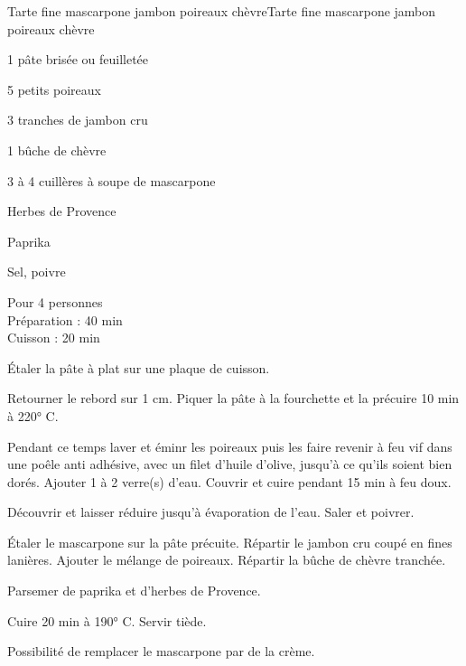 \begin{recette}{Tarte fine mascarpone jambon poireaux chèvre}{Tarte fine mascarpone jambon poireaux chèvre}

\begin{ingredients}
1 pâte brisée ou feuilletée\par
5 petits poireaux\par
3 tranches de jambon cru\par
1 bûche de chèvre\par
3 à 4 cuillères à soupe de mascarpone\par
Herbes de Provence\par
Paprika\par
Sel, poivre\par
\end{ingredients}

\begin{infos}
Pour 4 personnes\\
Préparation : 40 min\\
Cuisson : 20 min\\
\end{infos}

\begin{etapes}
\item Étaler la pâte à plat sur une plaque de cuisson.
\item Retourner le rebord sur 1 cm. Piquer la pâte à la fourchette et la précuire 10 min à 220° C.
\item Pendant ce temps laver et éminr les poireaux puis les faire revenir à feu vif dans une poêle anti adhésive, avec un filet d'huile d'olive, jusqu'à ce qu'ils soient bien dorés. Ajouter 1 à 2 verre(s) d'eau. Couvrir et cuire pendant 15 min à feu doux.
\item Découvrir et laisser réduire jusqu'à évaporation de l'eau. Saler et poivrer.
\item Étaler le mascarpone sur la pâte précuite. Répartir le jambon cru coupé en fines lanières. Ajouter le mélange de poireaux. Répartir la bûche de chèvre tranchée.
\item Parsemer de paprika et d'herbes de Provence.
\item Cuire 20 min à 190° C. Servir tiède.
\end{etapes}

\begin{conseils}
Possibilité de remplacer le mascarpone par de la crème.
\end{conseils}

\end{recette}